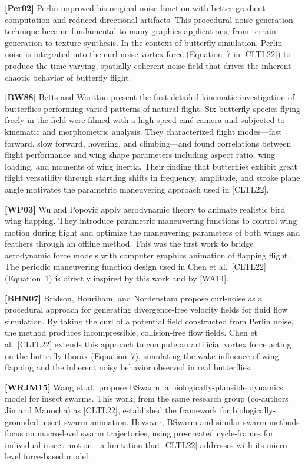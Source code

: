 \documentclass[12pt]{article}
\begin{document}
\bigskip\noindent
\textbf{[Per02]} Perlin improved his original noise function with better gradient
computation and reduced directional artifacts. This procedural noise generation
technique became fundamental to many graphics applications, from terrain generation
to texture synthesis. In the context of butterfly simulation, Perlin noise is
integrated into the curl-noise vortex force (Equation~7 in [CLTL22]) to produce
the time-varying, spatially coherent noise field that drives the inherent chaotic
behavior of butterfly flight.

\bigskip\noindent
\textbf{[BW88]} Betts and Wootton present the first detailed kinematic
investigation of butterflies performing varied patterns of natural flight. Six
butterfly species flying freely in the field were filmed with a high-speed cin\'e
camera and subjected to kinematic and morphometric analysis. They characterized
flight modes---fast forward, slow forward, hovering, and climbing---and found
correlations between flight performance and wing shape parameters including
aspect ratio, wing loading, and moments of wing inertia. Their finding that
butterflies exhibit great flight versatility through startling shifts in frequency,
amplitude, and stroke plane angle motivates the parametric maneuvering approach
used in [CLTL22].

\bigskip\noindent
\textbf{[WP03]} Wu and Popovi\'c apply aerodynamic theory to animate realistic
bird wing flapping. They introduce parametric maneuvering functions to control
wing motion during flight and optimize the maneuvering parameters of both wings
and feathers through an offline method. This was the first work to bridge
aerodynamic force models with computer graphics animation of flapping flight. The
periodic maneuvering function design used in Chen et al.\ [CLTL22] (Equation~1)
is directly inspired by this work and by [WA14].

\bigskip\noindent
\textbf{[BHN07]} Bridson, Houriham, and Nordenstam propose curl-noise as a
procedural approach for generating divergence-free velocity fields for fluid flow
simulation. By taking the curl of a potential field constructed from Perlin noise,
the method produces incompressible, collision-free flow fields. Chen et al.\
[CLTL22] extends this approach to compute an artificial vortex force acting on
the butterfly thorax (Equation~7), simulating the wake influence of wing flapping
and the inherent noisy behavior observed in real butterflies.

\bigskip\noindent
\textbf{[WRJM15]} Wang et al.\ propose BSwarm, a biologically-plausible dynamics
model for insect swarms. This work, from the same research group (co-authors Jin
and Manocha) as [CLTL22], established the framework for biologically-grounded
insect swarm animation. However, BSwarm and similar swarm methods focus on
macro-level swarm trajectories, using pre-created cycle-frames for individual
insect motion---a limitation that [CLTL22] addresses with its micro-level
force-based model.
\end{document}
